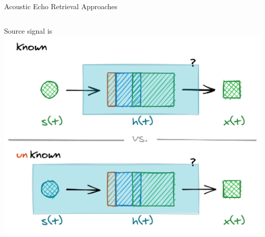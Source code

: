 \begin{frame}{Acoustic Echo Retrieval}
    \vfill
    Approaches
    \begin{columns}[T,onlytextwidth]
        \centering
        Source signal is
        \includegraphics[width=.9\textwidth]{./figures/active-passive.png}
        \hfill


\end{columns}
\end{frame}
